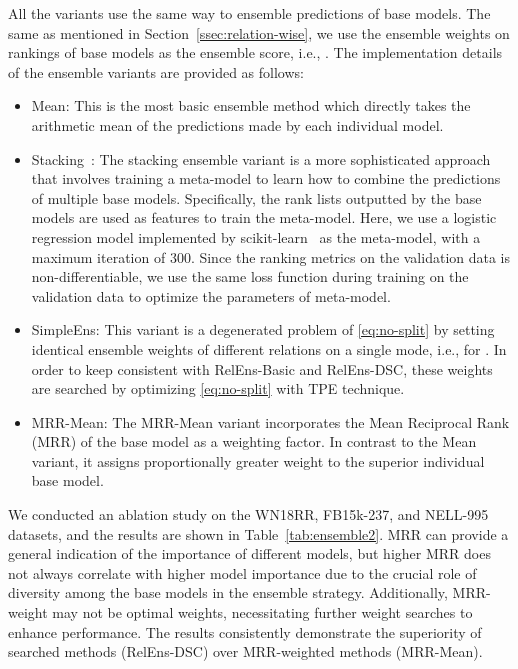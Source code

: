 \documentclass[11pt,a4paper]{article}
\begin{document}
  All the variants use the same way to ensemble predictions of base models.
  The same as mentioned in Section~\ref{ssec:relation-wise},
  we use the ensemble weights on rankings of base models 
  as the ensemble score,
  i.e., .
  The implementation details of the ensemble variants are provided as follows:
  \begin{itemize}
    \item Mean:	
      This is the most basic ensemble method which directly takes the arithmetic mean of the predictions made by each individual model.
      
    \item Stacking~\cite{wolpert1992stacked}:
    The stacking ensemble variant is a more sophisticated approach 
    that involves training a meta-model to learn how to combine the predictions of multiple base models. 
    Specifically, the rank lists outputted by the base models are used as features to train the meta-model. 
    Here, we use a logistic regression model implemented by scikit-learn~\cite{pedregosa2011scikit} as the meta-model, 
    with a maximum iteration of 300.
    Since the ranking metrics on the validation data is non-differentiable,
    we use the same loss function during training on the validation data
    to optimize the parameters of meta-model.
  
    \item SimpleEns: 
    This variant is a degenerated problem of \eqref{eq:no-split}
    by setting identical ensemble weights of different relations on a single mode,
    i.e.,  for .
    In order to keep consistent with RelEns-Basic and RelEns-DSC,
    these weights are searched by optimizing \eqref{eq:no-split} with TPE technique.
    
    \item MRR-Mean:
    The MRR-Mean variant incorporates the Mean Reciprocal Rank (MRR) of the base model as a weighting factor. 
    In contrast to the Mean variant, it assigns proportionally greater weight to the superior individual base model.
  
  \end{itemize}
  
  We conducted an ablation study on the WN18RR, FB15k-237, and NELL-995 datasets, and the results are shown in Table~\ref{tab:ensemble2}.
  MRR can provide a general indication of the importance of different models, 
  but higher MRR does not always correlate with higher model importance due to the crucial role of diversity among the base models in the ensemble strategy. 
  Additionally, MRR-weight may not be optimal weights, 
  necessitating further weight searches to enhance performance.
  The results consistently demonstrate the superiority of searched methods (RelEns-DSC) over MRR-weighted methods (MRR-Mean).
  
\end{document}
